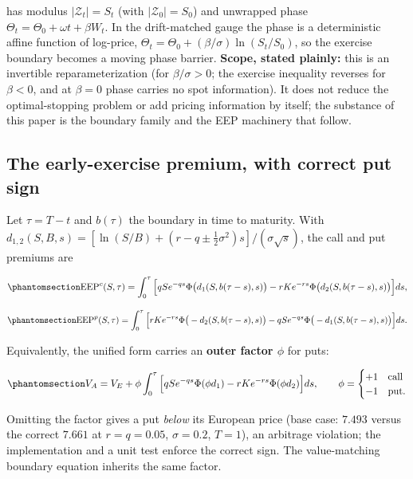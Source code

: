 \documentclass[
  english,
  10pt,
  letterpaper,
  DIV=11,
  numbers=noendperiod]{scrartcl}
\begin{document}
has modulus \(|\mathcal Z_t|=S_t\) (with \(|\mathcal Z_0|=S_0\)) and
unwrapped phase \(\Theta_t=\Theta_0+\omega t+\beta W_t\). In the
drift-matched gauge the phase is a deterministic affine function of
log-price, \(\Theta_t=\Theta_0+(\beta/\sigma)\ln(S_t/S_0)\), so the
exercise boundary becomes a moving phase barrier. \textbf{Scope, stated
plainly:} this is an invertible reparameterization (for
\(\beta/\sigma>0\); the exercise inequality reverses for \(\beta<0\),
and at \(\beta=0\) phase carries no spot information). It does not
reduce the optimal-stopping problem or add pricing information by
itself; the substance of this paper is the boundary family and the EEP
machinery that follow.

\subsection{The early-exercise premium, with correct put
sign}\label{sec-eep}

Let \(\tau=T-t\) and \(b(\tau)\) the boundary in time to maturity. With
\(d_{1,2}(S,B,s)=[\ln(S/B)+(r-q\pm\frac12\sigma^2)s]/(\sigma\sqrt s)\),
the call and put premiums are

\begin{equation}\protect\phantomsection\label{eq-eep-call}{
\mathrm{EEP}^{c}(S,\tau)
=
\int_0^\tau
\Big[
qS e^{-qs}\Phi\big(d_1(S,b(\tau-s),s)\big)
-rK e^{-rs}\Phi\big(d_2(S,b(\tau-s),s)\big)
\Big]ds,
}\end{equation}

\begin{equation}\protect\phantomsection\label{eq-eep-put}{
\mathrm{EEP}^{p}(S,\tau)
=
\int_0^\tau
\Big[
rK e^{-rs}\Phi\big(-d_2(S,b(\tau-s),s)\big)
-qS e^{-qs}\Phi\big(-d_1(S,b(\tau-s),s)\big)
\Big]ds.
}\end{equation}

Equivalently, the unified form carries an \textbf{outer factor \(\phi\)}
for puts:

\begin{equation}\protect\phantomsection\label{eq-eep-unified}{
V_A=V_E+\phi\int_0^\tau
\Big[
qS e^{-qs}\Phi(\phi d_1)-rK e^{-rs}\Phi(\phi d_2)
\Big]ds,\qquad \phi=\begin{cases}+1&\text{call}\\-1&\text{put.}\end{cases}
}\end{equation}

Omitting the factor gives a put \emph{below} its European price (base
case: \(7.493\) versus the correct \(7.661\) at \(r=q=0.05\),
\(\sigma=0.2\), \(T=1\)), an arbitrage violation; the implementation and
a unit test enforce the correct sign. The value-matching boundary
equation inherits the same factor.
\end{document}
